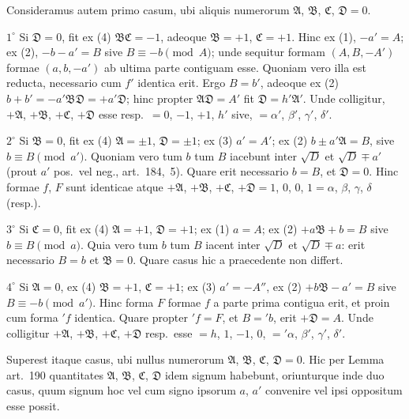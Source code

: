\documentclass[12pt,a4paper]{article}
\theoremstyle{plain}
\begin{document}
Consideramus autem primo casum, ubi aliquis numerorum $\mathfrak{A}$, $\mathfrak{B}$, $\mathfrak{C}$, $\mathfrak{D} = 0$.

$1^\circ$ Si $\mathfrak{D} = 0$, fit ex (4) $\mathfrak{B}\mathfrak{C} = -1$, adeoque $\mathfrak{B} = +1$, $\mathfrak{C} = +1$. Hinc ex (1), $-a' = A$; ex (2), $-b - a' = B$ sive $B \equiv -b \pmod{A}$; unde sequitur formam $(A, B, -A')$ formae $(a, b, -a')$ ab ultima parte contiguam esse. Quoniam vero illa est reducta, necessario cum $f'$ identica erit. Ergo $B = b'$, adeoque ex (2) $b + b' = -a'\mathfrak{B}\mathfrak{D} = +a'\mathfrak{D}$; hinc propter $\mathfrak{A}\mathfrak{D} = A'$ fit $\mathfrak{D} = h'\mathfrak{A}'$. Unde colligitur, $+\mathfrak{A}$, $+\mathfrak{B}$, $+\mathfrak{C}$, $+\mathfrak{D}$ esse resp.~$= 0$, $-1$, $+1$, $h'$ sive, $= \alpha'$, $\beta'$, $\gamma'$, $\delta'$.

$2^\circ$ Si $\mathfrak{B} = 0$, fit ex (4) $\mathfrak{A} = \pm 1$, $\mathfrak{D} = \pm 1$; ex (3) $a' = A'$; ex (2) $b \pm a'\mathfrak{A} = B$, sive $b \equiv B \pmod{a'}$. Quoniam vero tum $b$ tum $B$ iacebunt inter $\sqrt{D}$ et $\sqrt{D} \mp a'$ (prout $a'$ pos.~vel neg., art.~184,~5). Quare erit necessario $b = B$, et $\mathfrak{D} = 0$. Hinc formae $f$, $F$ sunt identicae atque $+\mathfrak{A}$, $+\mathfrak{B}$, $+\mathfrak{C}$, $+\mathfrak{D} = 1$, $0$, $0$, $1 = \alpha$, $\beta$, $\gamma$, $\delta$ (resp.).

$3^\circ$ Si $\mathfrak{C} = 0$, fit ex (4) $\mathfrak{A} = +1$, $\mathfrak{D} = +1$; ex (1) $a = A$; ex (2) $+ a\mathfrak{B} + b = B$ sive $b \equiv B \pmod{a}$. Quia vero tum $b$ tum $B$ iacent inter $\sqrt{D}$ et $\sqrt{D} \mp a$: erit necessario $B = b$ et $\mathfrak{B} = 0$. Quare casus hic a praecedente non differt.

$4^\circ$ Si $\mathfrak{A} = 0$, ex (4) $\mathfrak{B} = +1$, $\mathfrak{C} = +1$; ex (3) $a' = -A''$, ex (2) $+ b\mathfrak{B} - a' = B$ sive $B \equiv -b \pmod{a'}$. Hinc forma $F$ formae $f$ a parte prima contigua erit, et proin cum forma $'f$ identica. Quare propter $'f = F$, et $B = 'b$, erit $+\mathfrak{D} = A$. Unde colligitur $+\mathfrak{A}$, $+\mathfrak{B}$, $+\mathfrak{C}$, $+\mathfrak{D}$ resp.~esse $= h$, $1$, $-1$, $0$, $= '\alpha$, $\beta'$, $\gamma'$, $\delta'$.

Superest itaque casus, ubi nullus numerorum $\mathfrak{A}$, $\mathfrak{B}$, $\mathfrak{C}$, $\mathfrak{D} = 0$. Hic per Lemma art.~190 quantitates $\mathfrak{A}$, $\mathfrak{B}$, $\mathfrak{C}$, $\mathfrak{D}$ idem signum habebunt, oriunturque inde duo casus, quum signum hoc vel cum signo ipsorum $a$, $a'$ convenire vel ipsi oppositum esse possit.
\end{document}
